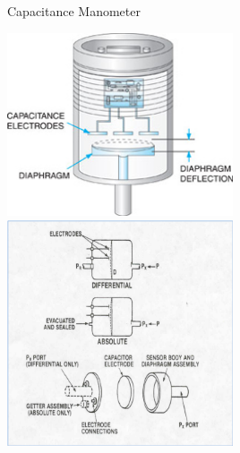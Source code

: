 \documentclass[11pt]{beamer}
\begin{document}
\begin{frame}{Capacitance Manometer }
\begin{center}
			\includegraphics[width=0.5\textwidth]{CapacitanceMano1.png}
			\includegraphics[width=0.5\textwidth]{CapacitanceMano3.png}
		\end{center}

\end{frame}
\end{document}
